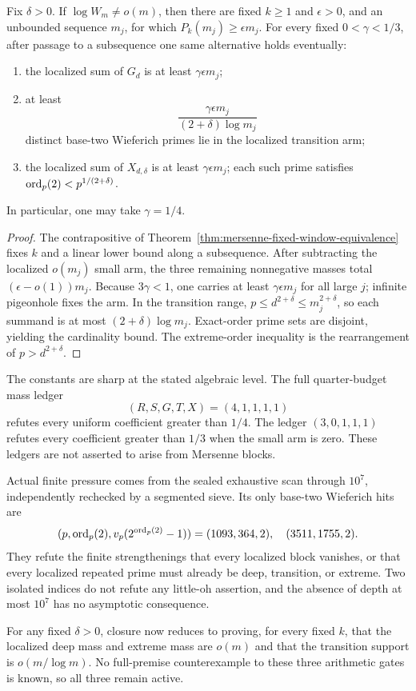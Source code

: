 \begin{theorem}
\label{thm:mersenne-fixed-window-three-arm}
Fix $\delta>0$.  If $\log W_m\ne o(m)$, then there are fixed $k\ge1$ and
$\epsilon>0$, and an unbounded sequence $m_j$, for which
$P_k(m_j)\ge\epsilon m_j$.  For every fixed $0<\gamma<1/3$, after passage
to a subsequence one same alternative holds eventually:
\begin{enumerate}
\item the localized sum of $G_d$ is at least $\gamma\epsilon m_j$;
\item at least
\[
 \frac{\gamma\epsilon m_j}{(2+\delta)\log m_j}
\]
distinct base-two Wieferich primes lie in the localized transition arm;
\item the localized sum of $X_{d,\delta}$ is at least
$\gamma\epsilon m_j$; each such prime satisfies
$\operatorname{ord}_p(2)<p^{1/(2+\delta)}$.
\end{enumerate}
In particular, one may take $\gamma=1/4$.
\end{theorem}

\begin{proof}
The contrapositive of
Theorem~\ref{thm:mersenne-fixed-window-equivalence} fixes $k$ and a linear
lower bound along a subsequence.  After subtracting the localized
$o(m_j)$ small arm, the three remaining nonnegative masses total
$(\epsilon-o(1))m_j$.  Because $3\gamma<1$, one carries at least
$\gamma\epsilon m_j$ for all large $j$; infinite pigeonhole fixes the arm.
In the transition range, $p\le d^{2+\delta}\le m_j^{2+\delta}$, so each
summand is at most $(2+\delta)\log m_j$.  Exact-order prime sets are
disjoint, yielding the cardinality bound.  The extreme-order inequality is
the rearrangement of $p>d^{2+\delta}$.
\end{proof}

The constants are sharp at the stated algebraic level.  The full
quarter-budget mass ledger
\[
 (R,S,G,T,X)=(4,1,1,1,1)
\]
refutes every uniform coefficient greater than $1/4$.  The ledger
$(3,0,1,1,1)$ refutes every coefficient greater than $1/3$ when the small arm
is zero.  These ledgers are not asserted to arise from Mersenne blocks.

Actual finite pressure comes from the sealed exhaustive scan through
$10^7$, independently rechecked by a segmented sieve.  Its only base-two
Wieferich hits are
\[
 (p,\operatorname{ord}_p(2),v_p(2^{\operatorname{ord}_p(2)}-1))=(1093,364,2),
 \quad(3511,1755,2).
\]
They refute the finite strengthenings that every localized block vanishes,
or that every localized repeated prime must already be deep, transition, or
extreme.  Two isolated indices do not refute any little-oh assertion, and
the absence of depth at most $10^7$ has no asymptotic consequence.

For any fixed $\delta>0$, closure now reduces to proving, for every fixed
$k$, that the localized deep mass and extreme mass are $o(m)$ and that the
transition support is $o(m/\log m)$.  No full-premise counterexample to these
three arithmetic gates is known, so all three remain active.
